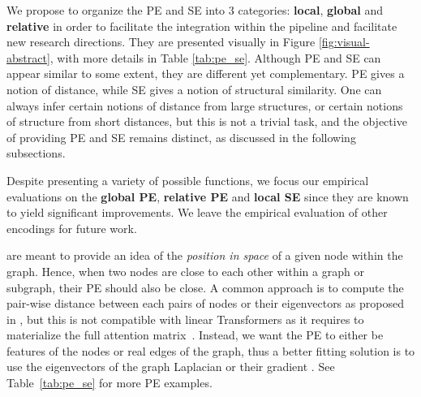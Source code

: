 \documentclass{article}
\begin{document}
We propose to organize the PE and SE into 3 categories: \textbf{local}, \textbf{global} and \textbf{relative} in order to facilitate the integration within the pipeline and facilitate new research directions. They are presented visually in Figure \ref{fig:visual-abstract}, with more details in Table \ref{tab:pe_se}. Although PE and SE can appear similar to some extent, they are different yet complementary. PE gives a notion of distance, while SE gives a notion of structural similarity. One can always infer certain notions of distance from large structures, or certain notions of structure from short distances, but this is not a trivial task, and the objective of providing PE and SE remains distinct, as discussed in the following subsections.

Despite presenting a variety of possible functions, we focus our empirical evaluations on the \textbf{global PE}, \textbf{relative PE} and \textbf{local SE} since they are known to yield significant improvements. We leave the empirical evaluation of other encodings for future work.


  are meant to provide an idea of the \textit{position in space} of a given node within the graph. Hence, when two nodes are close to each other within a graph or subgraph, their PE should also be close. A common approach is to compute the pair-wise distance between each pairs of nodes or their eigenvectors as proposed in \cite{li2020distance, ying2021graphormer, kreuzer2021rethinking, wang2022equivstable}, but this is not compatible with linear Transformers as it requires to materialize the full attention matrix~\cite{DBLP:conf/iclr/ChoromanskiLDSG21}. Instead, we want the PE to either be features of the nodes or real edges of the graph, thus a better fitting solution is to use the eigenvectors of the graph Laplacian or their gradient \cite{dwivedi2020benchmarking, beaini2021directional_dgn, kreuzer2021rethinking}. See Table~\ref{tab:pe_se} for more PE examples.
\end{document}
